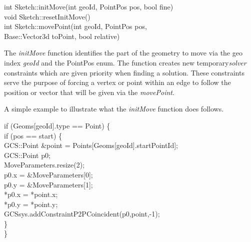 \documentclass[12pt,twoside,a4paper]{book}
\begin{document}
    \begin{codequote}
    int Sketch::initMove(int geoId, PointPos pos, bool fine)\\
    void Sketch::resetInitMove()\\
    int Sketch::movePoint(int geoId, PointPos pos, \\
    \-\hspace{4.1cm}Base::Vector3d toPoint, bool relative)
    \end{codequote}

    The \emph{initMove} function identifies the part of the geometry to move via the geo index \emph{geoId} and the PointPos enum. The function creates new temporary\emph{solver} constraints which are given priority when finding a solution. These constraints serve the purpose of forcing a vertex or point within an edge to follow the position or vector that will be given via the \emph{movePoint}.

    A simple example to illustrate what the \emph{initMove} function does follows.

    \begin{codequote}
    if (Geoms[geoId].type == Point) \{\\
    \-\hspace{0.5cm}if (pos == start) \{\\
    \-\hspace{1cm}GCS::Point \&point = Points[Geoms[geoId].startPointId];\\
    \-\hspace{1cm}GCS::Point p0;\\
    \-\hspace{1cm}MoveParameters.resize(2); \\
    \-\hspace{1cm}p0.x = \&MoveParameters[0]; \\
    \-\hspace{1cm}p0.y = \&MoveParameters[1]; \\
    \-\hspace{1cm}*p0.x = *point.x; \\
    \-\hspace{1cm}*p0.y = *point.y; \\
    \-\hspace{1cm}GCSsys.addConstraintP2PCoincident(p0,point,-1); \\
    \-\hspace{0.5cm}\} \\
    \}
    \end{codequote}
\end{document}

